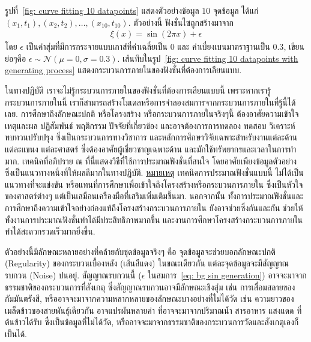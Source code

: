 รูปที่~\ref{fig: curve fitting 10 datapoints} แสดงตัวอย่างข้อมูล $10$ จุดข้อมูล ได้แก่ $(x_1, t_1), (x_2, t_2), \ldots, (x_{10}, t_{10})$.
ตัวอย่างนี้ ฟังชั่นไซถูกสร้างมาจาก 
%
\begin{eqnarray}
\xi(x) = \sin(2 \pi x) + \epsilon
\label{eq: bg sin generation}
\end{eqnarray}
%
โดย $\epsilon$ เป็นค่าสุ่มที่มีการกระจายแบบเกาส์ที่ค่าเฉลี่ยเป็น $0$ และ ค่าเบี่ยงเบนมาตราฐานเป็น $0.3$, เขียนย่อๆคือ $\epsilon \sim
\mathcal{N}(\mu=0, \sigma=0.3)$.
เส้นทึบในรูป~\ref{fig: curve fitting 10 datapoints with generating process} แสดงกระบวนการภายในของฟังชั่นที่ต้องการเลียนแบบ.

{\small
\begin{shaded}
ในทางปฏิบัติ เราจะไม่รู้กระบวนการภายในของฟังชั่นที่ต้องการเลียนแบบนี้ เพราะหากเรารู้กระบวนการภายในนี้
เราก็สามารถสร้างโมเดลหรือการจำลองสมการจากกระบวนการภายในที่รู้นี้ได้เลย.
การศึกษาถึงลักษณะปกติ หรือโครงสร้าง หรือกระบวนการภายในจริงๆนี้ 
ต้องอาศัยความเข้าใจเหตุและผล ปฏิสัมพันธ์ พฤติกรรม ปัจจัยที่เกี่ยวข้อง และอาจต้องการการทดลอง ทดสอบ วิเคราะห์ ทบทวนปรับปรุง ซึ่งเป็นกระบวนการทางวิชาการ และหลักการศึกษาวิจัยเฉพาะสำหรับงานแต่ละด้าน แต่ละแขนง แต่ละศาสตร์ ซึ่งต้องอาศัยผู้เชี่ยวชาญเฉพาะด้าน และมักใช้ทรัพยากรและเวลาในการทำมาก.
เทคนิคที่อภิปราย ณ ที่นี้แสดงวิธีที่ใช้การประมาณฟังชั่นที่สนใจ โดยอาศัยเพียงข้อมูลตัวอย่าง ซึ่งเป็นแนวทางหนึ่งที่ให้ผลดีมากในทางปฏิบัติ.
\underline{หมายเหตุ} เทคนิคการประมาณฟังชั่นแบบนี้ ไม่ได้เป็นแนวทางที่จะแข่งขัน 
หรือแทนที่การศึกษาเพื่อเข้าใจถึงโครงสร้างหรือกระบวนการภายใน 
ซึ่งเป็นหัวใจของศาสตร์ต่างๆ แต่เป็นเสมือนเครืองมือที่เสริมเพิ่มเติมขึ้นมา.
นอกจากนั้น ทั้งการประมาณฟังชั่นและการศึกษาถึงความเข้าใจอย่างถ่องแท้ถึงโครงสร้างกระบวนการภายใน 
ยังอาจช่วยซึ่งกันและกัน ช่วยให้ทั้งงานการประมาณฟังชั่นทำได้มีประสิทธิภาพมากขึ้น 
และงานการศึกษาโครงสร้างกระบวนการภายในทำได้สะดวกรวดเร็วมากยิ่งขึ้น.
\end{shaded}
}%

ตัวอย่างนี้มีลักษณะหลายอย่างที่คล้ายกับชุดข้อมูลจริงๆ 
คือ จุดข้อมูลจะช่วยบอกลักษณะปกติ (Regularity) ของกระบวนเบื้องหลัง (เส้นสีแดง) 
ในขณะเดียวกัน แต่ละจุดข้อมูลจะมีสัญญาณรบกวน (Noise) ปนอยู่.
สัญญาณรบกวนนี้ ($\epsilon$ ในสมการ~\ref{eq: bg sin generation}) อาจจะมาจากธรรมชาติของกระบวนการที่สังเกตุ 
ซึ่งสัญญาณรบกวนอาจมีลักษณะเชิงสุ่ม เช่น การเสื่อมสลายของกัมมันตรังสี, 
หรืออาจจะมาจากความหลากหลายของลักษณะบางอย่างที่ไม่ได้วัด เช่น ความยาวของเมล็ดข้าวของสายพันธ์ุเดียวกัน อาจแปรผันหลายค่า ที่อาจจะมาจากปริมาณน้ำ สารอาหาร แสงแดด ที่ต้นข้าวได้รับ ซึ่งเป็นข้อมูลที่ไม่ได้วัด, 
หรืออาจจะมาจากธรรมชาติของกระบวนการวัดและสังเกตุเองก็เป็นได้.

